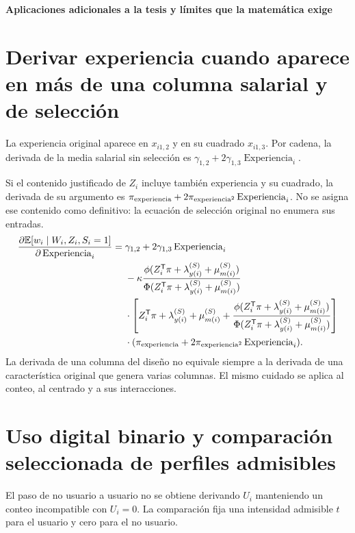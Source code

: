 \documentclass[11pt,a4paper]{article}
\newcommand{\E}{\mathbb E}
\begin{document}
\clearpage
{}
{\large\bfseries\color{azul}Aplicaciones adicionales a la tesis y límites que la matemática exige}\par\vspace{2mm}
\section{Derivar experiencia cuando aparece en más de una columna salarial y de selección}

La experiencia original aparece en $x_{i1,2}$ y en su cuadrado $x_{i1,3}$. Por cadena, la derivada de la media salarial sin selección es
$\gamma_{1,2}+2\gamma_{1,3}\operatorname{Experiencia}_i$.

Si el contenido justificado de $Z_i$ incluye también experiencia y su cuadrado, la derivada de su argumento es
$\pi_{\rm experiencia}+2\pi_{\rm experiencia^2}\operatorname{Experiencia}_i$.
No se asigna ese contenido como definitivo: la ecuación de selección original no enumera sus entradas.
\[
\begin{aligned}
\frac{\partial\E[w_i\mid W_i,Z_i,S_i=1]}
{\partial\operatorname{Experiencia}_i}
={}&\gamma_{1,2}+2\gamma_{1,3}\operatorname{Experiencia}_i\\
&-\kappa\frac{\phi(Z_i^{\mathsf T}\pi+\lambda_{y(i)}^{(S)}+\mu_{m(i)}^{(S)})}
{\Phi(Z_i^{\mathsf T}\pi+\lambda_{y(i)}^{(S)}+\mu_{m(i)}^{(S)})}\\
&\cdot\left[Z_i^{\mathsf T}\pi+\lambda_{y(i)}^{(S)}+\mu_{m(i)}^{(S)}
+\frac{\phi(Z_i^{\mathsf T}\pi+\lambda_{y(i)}^{(S)}+\mu_{m(i)}^{(S)})}
{\Phi(Z_i^{\mathsf T}\pi+\lambda_{y(i)}^{(S)}+\mu_{m(i)}^{(S)})}\right]\\
&\cdot(\pi_{\rm experiencia}+2\pi_{\rm experiencia^2}\operatorname{Experiencia}_i).
\end{aligned}
\]
La derivada de una columna del diseño no equivale siempre a la derivada de una característica original que genera varias columnas. El mismo cuidado se aplica al conteo, al centrado y a sus interacciones.

\clearpage
\section{Uso digital binario y comparación seleccionada de perfiles admisibles}

El paso de no usuario a usuario no se obtiene derivando $U_i$ manteniendo un conteo incompatible con $U_i=0$. La comparación fija una intensidad admisible $t$ para el usuario y cero para el no usuario.
\end{document}
